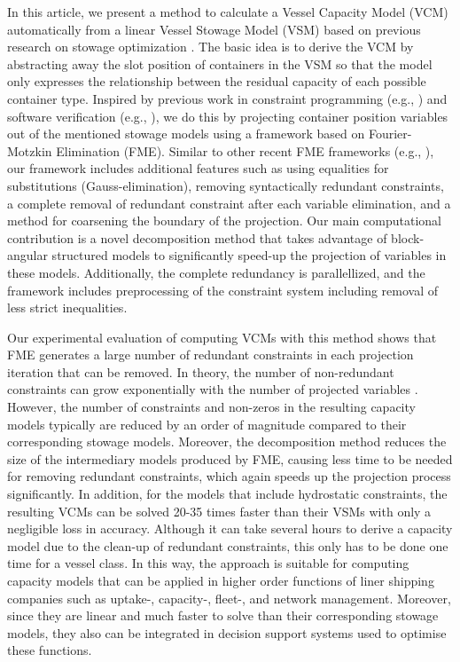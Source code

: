 \documentclass[citeauthoryear]{llncs}
\begin{document}
In this article, we present a method to calculate a Vessel Capacity Model (VCM) automatically from a linear Vessel Stowage Model (VSM) based on previous research on stowage optimization \cite{pacino11,AlbertosThesis}. 
The basic idea is to derive the VCM by abstracting away the slot position of containers in the VSM so that the model only expresses the relationship between the residual capacity of each possible container type.
Inspired by previous work in constraint programming (e.g., \cite{lassez90}) and software verification (e.g., \cite{benoy05}), we do this by projecting container position variables out of the mentioned stowage models using a framework based on Fourier-Motzkin Elimination (FME). Similar to other recent FME frameworks (e.g., \cite{simon05,lukatskii08,shapot12}), our framework includes additional features such as using equalities for substitutions (Gauss-elimination), removing syntactically redundant constraints, a complete removal of redundant constraint after each variable elimination, and a method for coarsening the boundary of the projection. Our main computational contribution is a novel decomposition method that takes advantage of block-angular structured models to significantly speed-up the projection of variables in these models. Additionally, the complete redundancy is parallellized, and the framework includes preprocessing of the constraint system including removal of less strict inequalities.

Our experimental evaluation of computing VCMs with this method shows that FME generates a large number of redundant constraints in each projection iteration that can be removed. In theory, the number of non-redundant constraints can grow exponentially with the number of projected variables \cite{monniaux10}. However, the number of constraints and non-zeros in the resulting capacity models typically are reduced by an order of magnitude compared to their corresponding stowage models. Moreover, the decomposition method reduces the size of the intermediary models produced by FME, causing less time to be needed for removing redundant constraints, which again speeds up the projection process significantly. In addition, for the models that include hydrostatic constraints, the resulting VCMs can be solved 20-35 times faster than their VSMs with only a negligible loss in accuracy. Although it can take several hours to derive a capacity model due to the clean-up of redundant constraints, this only has to be done one time for a vessel class. In this way, the approach is suitable for computing capacity models that can be applied in higher order functions of liner shipping companies such as uptake-, capacity-, fleet-, and network management. Moreover, since they are linear and much faster to solve than their corresponding stowage models, they also can be integrated in decision support systems used to optimise these functions.
\end{document}
